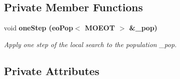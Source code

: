 \subsection*{Private Member Functions}
\begin{CompactItemize}
\item 
void \bf{one\-Step} (\bf{eo\-Pop}$<$ MOEOT $>$ \&\_\-pop)
\begin{CompactList}\small\item\em Apply one step of the local search to the population \_\-pop. \item\end{CompactList}\end{CompactItemize}
\subsection*{Private Attributes}
